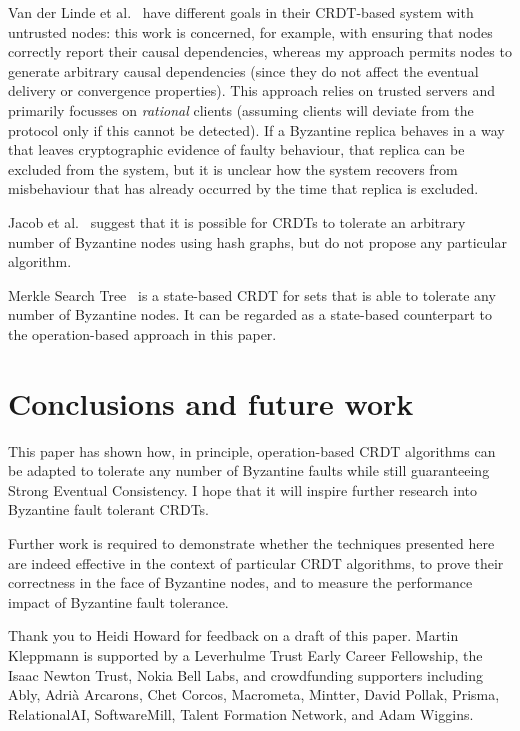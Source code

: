 \documentclass[sigplan,review]{acmart}
\begin{document}
Van der Linde et al.~\cite{vanderLinde:2020} have different goals in their CRDT-based system with untrusted nodes: this work is concerned, for example, with ensuring that nodes correctly report their causal dependencies, whereas my approach permits nodes to generate arbitrary causal dependencies (since they do not affect the eventual delivery or convergence properties).
This approach relies on trusted servers and primarily focusses on \emph{rational} clients (assuming clients will deviate from the protocol only if this cannot be detected).
If a Byzantine replica behaves in a way that leaves cryptographic evidence of faulty behaviour, that replica can be excluded from the system, but it is unclear how the system recovers from misbehaviour that has already occurred by the time that replica is excluded.

Jacob et al.~\cite{Jacob:2021} suggest that it is possible for CRDTs to tolerate an arbitrary number of Byzantine nodes using hash graphs, but do not propose any particular algorithm.

Merkle Search Tree~\cite{Auvolat:2019} is a state-based CRDT for sets that is able to tolerate any number of Byzantine nodes.
It can be regarded as a state-based counterpart to the operation-based approach in this paper.

\section{Conclusions and future work}\label{sec:conclusions}

This paper has shown how, in principle, operation-based CRDT algorithms can be adapted to tolerate any number of Byzantine faults while still guaranteeing Strong Eventual Consistency.
I hope that it will inspire further research into Byzantine fault tolerant CRDTs.

Further work is required to demonstrate whether the techniques presented here are indeed effective in the context of particular CRDT algorithms, to prove their correctness in the face of Byzantine nodes, and to measure the performance impact of Byzantine fault tolerance.

\begin{acks}
Thank you to Heidi Howard for feedback on a draft of this paper.
Martin Kleppmann is supported by a Leverhulme Trust Early Career Fellowship, the Isaac Newton Trust, Nokia Bell Labs, and crowdfunding supporters including Ably, Adrià Arcarons, Chet Corcos, Macrometa, Mintter, David Pollak, Prisma, RelationalAI, SoftwareMill, Talent Formation Network, and Adam Wiggins.
\end{acks}



\end{document}
